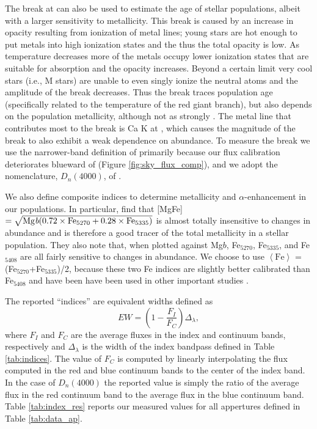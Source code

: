The break at  can also be used to estimate the age of
stellar populations, albeit with a larger sensitivity to
metallicity. This break is caused by an increase in opacity resulting
from ionization of metal lines; young stars are hot enough to put
metals into high ionization states and the thus the total opacity is
low. As temperature decreases more of the metals occupy lower
ionization states that are suitable for absorption and the opacity
increases. Beyond a certain limit very cool stars (i.e., M stars) are
unable to even singly ionize the neutral atoms and the amplitude of
the break decreases. Thus the  break traces population
age (specifically related to the temperature of the red giant branch),
but also depends on the population metallicity, although not as
strongly \citep[see][and Figure \ref{fig:D4000_cuts} here]{Bruzual83}.
The metal line that contributes most to the  break is
Ca K at , which causes the magnitude of the break to
also exhibit a weak dependence on abundance. To measure the
 break we use the narrower-band definition of
\citet{Balogh99} primarily because our flux calibration deteriorates
blueward of  (Figure \ref{fig:sky_flux_comp}), and we
adopt the nomenclature, $D_n(4000)$, of \citet{Kauffmann03}.

We also define composite indices to determine metallicity and
$\alpha$-enhancement in our populations. In particular,
\citet{Thomas03} find that [MgFe] $= \sqrt{\mathrm{Mg
    \emph{b}}(0.72\times\mathrm{Fe}_{5270} +
  0.28\times\mathrm{Fe}_{5335})}$ is almost totally insensitive to
changes in abundance and is therefore a good tracer of the total
metallicity in a stellar population. They also note that, when plotted
against Mg$b$, Fe$_{5270}$, Fe$_{5335}$, and Fe$_{5408}$ are all
fairly sensitive to changes in abundance. We choose to use
$\left<\mathrm{Fe}\right>$ = (Fe$_{5270}$+Fe$_{5335}$)/2, because
these two Fe indices are slightly better calibrated than Fe$_{5408}$
\citep{Thomas03} and have been have been used in other important
studies \citep[e.g.,][]{Trager05,Trager08,Trager09}.

The reported ``indices'' are equivalent widths defined as
\begin{equation}
  EW = \left(1 - \frac{F_I}{F_C}\right)\Delta_{\lambda},
\end{equation}
where $F_I$ and $F_C$ are the average fluxes in the index and
continuum bands, respectively and $\Delta_{\lambda}$ is the width of
the index bandpass defined in Table \ref{tab:indices}. The value of
$F_C$ is computed by linearly interpolating the flux computed in the
red and blue continuum bands to the center of the index band. In the
case of $D_n(4000)$ the reported value is simply the ratio of the
average flux in the red continuum band to the average flux in the blue
continuum band. Table \ref{tab:index_res} reports our measured values
for all appertures defined in Table \ref{tab:data_ap}.

